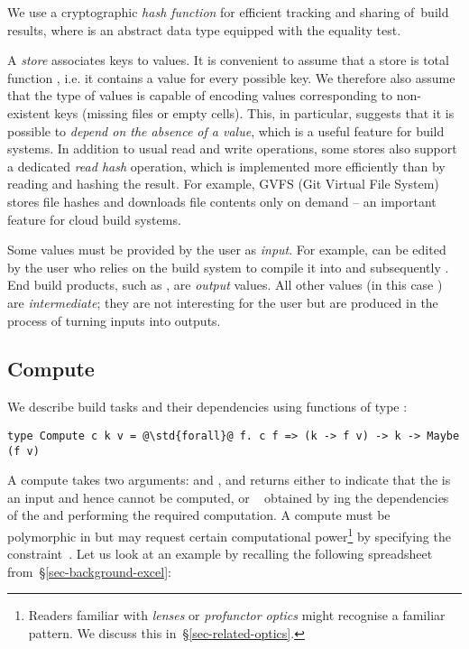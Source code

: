 We use a cryptographic \emph{hash function}  for efficient
tracking and sharing of~build results, where  is an abstract data type
equipped with the equality test.

A \emph{store} associates keys to values. It is convenient to assume that a
store is total function \store, i.e. it contains a value for every possible key.
We therefore also assume that the type of values is capable of encoding values
corresponding to non-existent keys (missing files or empty cells). This, in
particular, suggests that it is possible to \emph{depend on the absence of a
value}, which is a useful feature for build systems. In addition to usual
read and write operations, some stores also support a dedicated \emph{read hash}
operation, which is implemented more efficiently than by reading and hashing the
result. For example, GVFS (Git Virtual File System)~\cite{gvfs} stores file
hashes and downloads file contents only on demand -- an important feature for
cloud build systems.

Some values must be provided by the user as \emph{input}. For example,
 can be edited by the user who relies on the build system to
compile it into  and subsequently . End build products,
such as , are \emph{output} values. All other values (in this case
) are \emph{intermediate}; they are not interesting for the user
but are produced in the process of turning inputs into outputs.

\subsection{Compute}\label{sec-compute-applicative}

We describe build tasks and their dependencies using functions of type
:

\vspace{1mm}
\begin{verbatim}
type Compute c k v = @\std{forall}@ f. c f => (k -> f v) -> k -> Maybe (f v)
\end{verbatim}
\vspace{1mm}

\noindent
A compute takes two arguments:  and , and
returns either  to indicate that the  is an input and hence
cannot be computed, or ~ obtained by ing the
dependencies of the  and performing the required computation. A compute
must be polymorphic in  but may request certain computational
power\footnote{Readers familiar with \emph{lenses} or \emph{profunctor optics}
might recognise a familiar pattern. We discuss this in~\S\ref{sec-related-optics}.}
by specifying the constraint~. Let us look at an example by recalling the
following spreadsheet from~\S\ref{sec-background-excel}:

